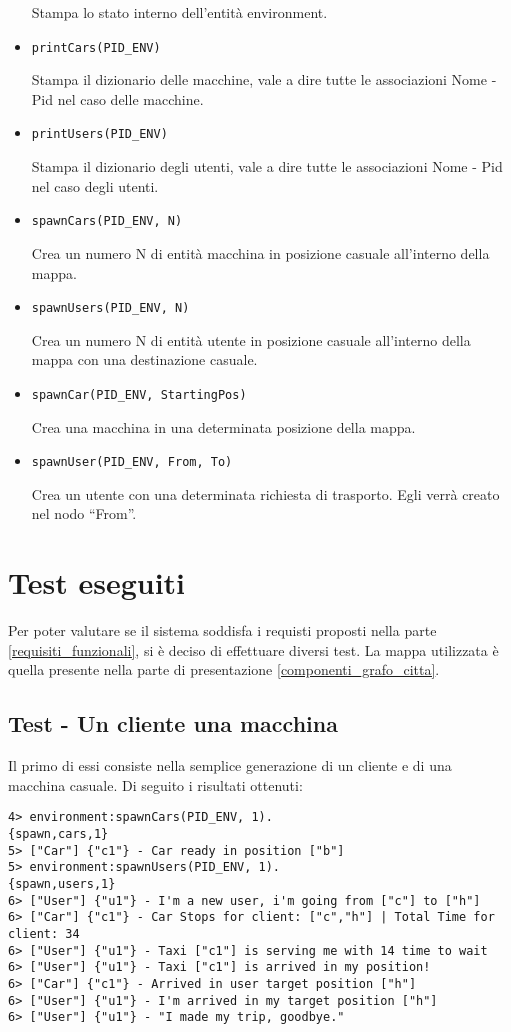 \begin{itemize}
	Stampa lo stato interno dell'entità environment.
	\item \lstinline |printCars(PID_ENV)|

	Stampa il dizionario delle macchine, vale a dire tutte le associazioni Nome - Pid nel caso delle macchine.
	\item \lstinline |printUsers(PID_ENV)|

	Stampa il dizionario degli utenti, vale a dire tutte le associazioni Nome - Pid nel caso degli utenti.
	\item \lstinline |spawnCars(PID_ENV, N)|

	Crea un numero N di entità macchina in posizione casuale all'interno della mappa.
	\item \lstinline |spawnUsers(PID_ENV, N)|

	Crea un numero N di entità utente in posizione casuale all'interno della mappa con una destinazione casuale.
	\item \lstinline |spawnCar(PID_ENV, StartingPos)|

	Crea una macchina in una determinata posizione della mappa.
	\item \lstinline |spawnUser(PID_ENV, From, To)|	

	Crea un utente con una determinata richiesta di trasporto. Egli verrà creato nel nodo ``From''.
\end{itemize}

\section{Test eseguiti}\label{test_eseguiti}
Per poter valutare se il sistema soddisfa i requisti proposti nella parte \ref{requisiti_funzionali}, si è deciso di effettuare diversi test. La mappa utilizzata è quella presente nella parte di presentazione \ref{componenti_grafo_citta}.

\subsection{Test - Un cliente una macchina}
Il primo di essi consiste nella semplice generazione di un cliente e di una macchina casuale. Di seguito i risultati ottenuti:

\begin{lstlisting}
4> environment:spawnCars(PID_ENV, 1).
{spawn,cars,1}
5> ["Car"] {"c1"} - Car ready in position ["b"]
5> environment:spawnUsers(PID_ENV, 1).
{spawn,users,1}
6> ["User"] {"u1"} - I'm a new user, i'm going from ["c"] to ["h"]
6> ["Car"] {"c1"} - Car Stops for client: ["c","h"] | Total Time for client: 34
6> ["User"] {"u1"} - Taxi ["c1"] is serving me with 14 time to wait
6> ["User"] {"u1"} - Taxi ["c1"] is arrived in my position!
6> ["Car"] {"c1"} - Arrived in user target position ["h"]
6> ["User"] {"u1"} - I'm arrived in my target position ["h"]
6> ["User"] {"u1"} - "I made my trip, goodbye."
\end{lstlisting}

